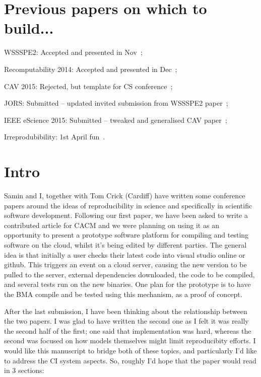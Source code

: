 \documentclass[a4paper,11pt]{article}
\begin{document}
\section*{Previous papers on which to build...}
\begin{compactdesc}
\item[WSSSPE2:] Accepted and presented in Nov~\cite{crick-et-al_wssspe2};
\item[Recomputability 2014:] Accepted and presented in Dec~\cite{crick-et-al_recomp2014};
\item[CAV 2015:] Rejected, but template for CS
  conference~\cite{crick-et-al-cav};
\item[JORS:] Submitted -- updated invited submission from WSSSPE2
  paper~\cite{crick-et-al:2015};
\item[IEEE eScience 2015:] Submitted -- tweaked and generalised CAV
  paper~\cite{crick-et-al_escience};
\item[Irreprodubibility:] 1st April fun~\cite{chuehong-et-al:2015}.
\end{compactdesc}

\section{Intro}


Samin and I, together with Tom Crick (Cardiff) have written some
conference papers around the ideas of reproducibility in science and specifically in
scientific software development. Following our first paper, we have
been asked to write a contributed article for CACM and we were
planning on using it as an opportunity to present a prototype software
platform for compiling and testing software on the cloud, whilst it's
being edited by different parties. The general idea is that initially
a user checks their latest code into visual studio online or
github. This triggers an event on a cloud server, causing the new
version to be pulled to the server, external dependencies downloaded,
the code to be compiled, and several tests run on the new
binaries. One plan for the prototype is to have the BMA compile and be
tested using this mechanism, as a proof of concept.


After the last submission, I have been thinking about the relationship
between the two papers. I was glad to have written the second one as I
felt it was really the second half of the first; one said that
implementation was hard, whereas the second was focused on how models
themselves might limit reproducibity efforts. I would like this
manuscript to bridge both of these topics, and particularly I'd like
to address the CI system aspects. So, roughly I'd hope that the paper
would read in 3 sections:
\end{document}
